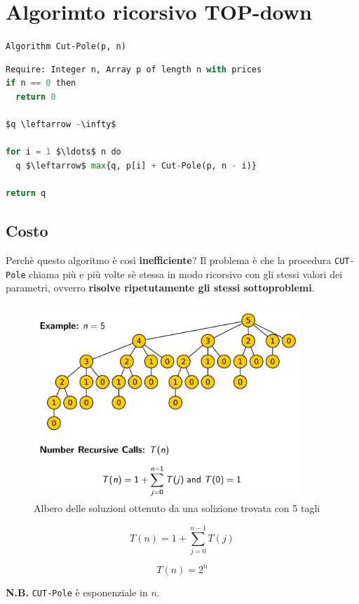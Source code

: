 \section{Algorimto ricorsivo TOP-down}

\texttt{Algorithm\ Cut-Pole(p,\ n)}

\begin{lstlisting}[language=Python, mathescape=true]
Require: Integer n, Array p of length n with prices
if n == 0 then
  return 0

$q \leftarrow -\infty$

for i = 1 $\ldots$ n do
  q $\leftarrow$ max{q, p[i] + Cut-Pole(p, n - i)}

return q
\end{lstlisting}

\subsection{Costo}

Perchè questo algoritmo è così \textbf{inefficiente}? Il problema è che
la procedura \texttt{CUT-Pole} chiama più e più volte sè stessa in modo
ricorsivo con gli stessi valori dei parametri, ovverro \textbf{risolve
  ripetutamente gli stessi sottoproblemi}.
\begin{figure}[H]
\centering
  \includegraphics[width=10cm, keepaspectratio]{Programmazione_dinamica/imgs/pole4.png}
  \caption{Albero delle soluzioni ottenuto da una solizione trovata con 5 tagli}

\end{figure}

$$
  T(n) = 1 + \sum^{n-1}_{j=0}T(j)
$$

$$
  T(n) = 2^n
$$

\textbf{N.B.} \texttt{CUT-Pole} è esponenziale in $n$.\\

